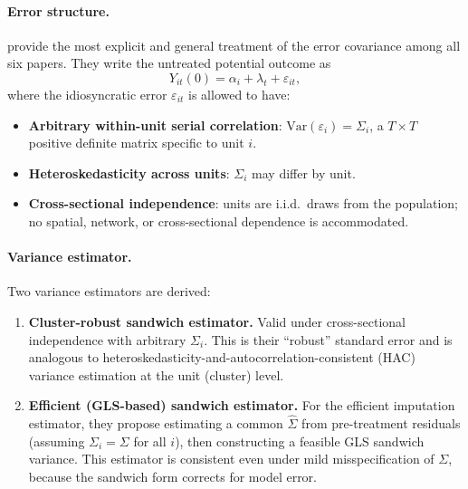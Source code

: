 \documentclass[12pt]{article}
\begin{document}
\paragraph{Error structure.}
\citet{borusyak2024revisiting} provide the most explicit and general treatment of
the error covariance among all six papers.
They write the untreated potential outcome as
\[
  Y_{it}(0) = \alpha_i + \lambda_t + \varepsilon_{it},
\]
where the idiosyncratic error $\varepsilon_{it}$ is allowed to have:
\begin{itemize}
  \item \textbf{Arbitrary within-unit serial correlation}: $\mathrm{Var}(\varepsilon_i)
        = \Sigma_i$, a $T \times T$ positive definite matrix specific to unit $i$.
  \item \textbf{Heteroskedasticity across units}: $\Sigma_i$ may differ by unit.
  \item \textbf{Cross-sectional independence}: units are i.i.d.\ draws from the
        population; no spatial, network, or cross-sectional dependence is
        accommodated.
\end{itemize}

\paragraph{Variance estimator.}
Two variance estimators are derived:
\begin{enumerate}
  \item \textbf{Cluster-robust sandwich estimator.}
        Valid under cross-sectional independence with arbitrary $\Sigma_i$.
        This is their ``robust'' standard error and is analogous to
        heteroskedasticity-and-autocorrelation-consistent (HAC) variance
        estimation at the unit (cluster) level.
  \item \textbf{Efficient (GLS-based) sandwich estimator.}
        For the efficient imputation estimator, they propose estimating a common
        $\hat{\Sigma}$ from pre-treatment residuals (assuming $\Sigma_i = \Sigma$
        for all $i$), then constructing a feasible GLS sandwich variance.
        This estimator is consistent even under mild misspecification of $\Sigma$,
        because the sandwich form corrects for model error.
\end{enumerate}
\end{document}
